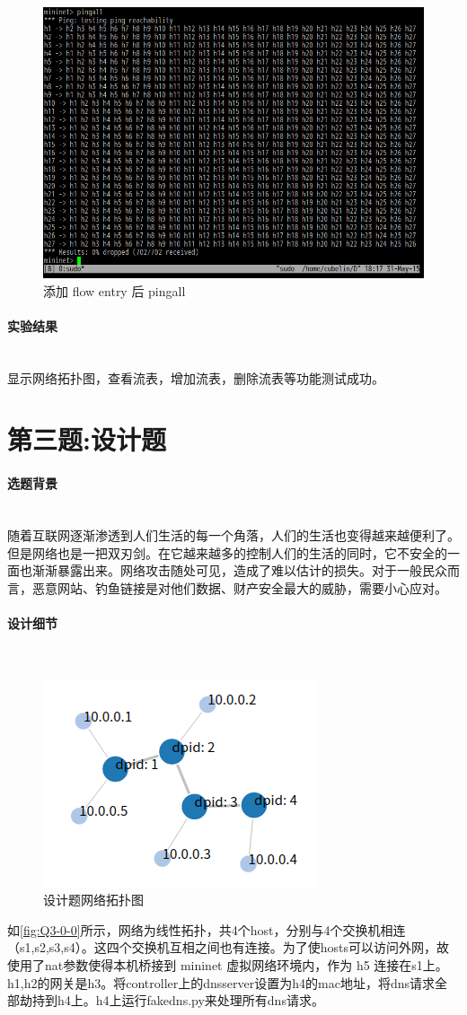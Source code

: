 \documentclass[format=draft,language=chinese,category=SDN]{hustreport}
\newcommand{\myparagraph}[1]{\paragraph{#1}\mbox{}\\}
\begin{document}
\begin{figure}[!h]
\centering
\includegraphics[width=.5\textwidth]{fig/2_2-8.png}
\caption{添加 flow entry 后 pingall}\label{fig:Q2_2-8}
\end{figure}

\myparagraph{实验结果}

显示网络拓扑图，查看流表，增加流表，删除流表等功能测试成功。

\clearpage

\section{第三题:设计题}\label{sec:Q3}

\myparagraph{选题背景}

随着互联网逐渐渗透到人们生活的每一个角落，人们的生活也变得越来越便利了。但是网络也是一把双刃剑。在它越来越多的控制人们的生活的同时，它不安全的一面也渐渐暴露出来。网络攻击随处可见，造成了难以估计的损失。对于一般民众而言，恶意网站、钓鱼链接是对他们数据、财产安全最大的威胁，需要小心应对。

\myparagraph{设计细节}
\begin{figure}[!h]
\centering
\includegraphics[width=.5\textwidth]{fig/3_0-0}
\caption{设计题网络拓扑图}\label{fig:Q3-0-0}
\end{figure}

如\autoref{fig:Q3-0-0}所示，网络为线性拓扑，共4个host，分别与4个交换机相连（s1,s2,s3,s4）。这四个交换机互相之间也有连接。为了使hosts可以访问外网，故使用了nat参数使得本机桥接到 mininet 虚拟网络环境内，作为 h5 连接在s1上。h1,h2的网关是h3。将controller上的dnsserver设置为h4的mac地址，将dns请求全部劫持到h4上。h4上运行fakedns.py来处理所有dns请求。
\end{document}
